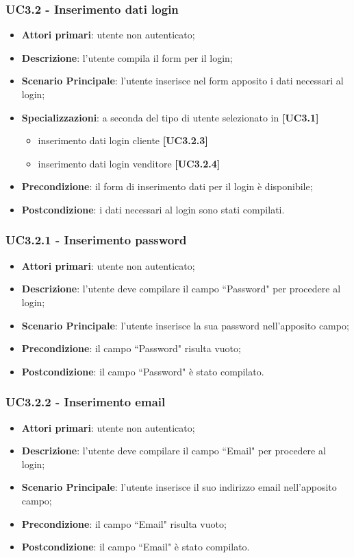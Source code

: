 \subsubsection{UC3.2 - Inserimento dati login}
\begin{itemize}
\item \textbf{Attori primari}: utente non autenticato;
\item \textbf{Descrizione}: l'utente compila il form per il login;
\item \textbf{Scenario Principale}: l'utente inserisce nel form apposito i dati necessari al login;
\item \textbf{Specializzazioni}: a seconda del tipo di utente selezionato in \textbf{[UC3.1]}
\begin{itemize}
	\item inserimento dati login cliente \textbf{[UC3.2.3]}
	\item inserimento dati login venditore \textbf{[UC3.2.4]}
\end{itemize}
\item \textbf{Precondizione}: il form di inserimento dati per il login è disponibile;
\item \textbf{Postcondizione}: i dati necessari al login sono stati compilati.
\end{itemize}

\subsubsection{UC3.2.1 - Inserimento password}
\begin{itemize}
\item \textbf{Attori primari}: utente non autenticato;
\item \textbf{Descrizione}: l'utente deve compilare il campo ``Password" per procedere al login;
\item \textbf{Scenario Principale}: l'utente inserisce la sua password nell'apposito campo;
\item \textbf{Precondizione}: il campo ``Password" risulta vuoto;
\item \textbf{Postcondizione}: il campo ``Password" è stato compilato.
\end{itemize}

\subsubsection{UC3.2.2 - Inserimento email}
\begin{itemize}
\item \textbf{Attori primari}: utente non autenticato;
\item \textbf{Descrizione}: l'utente deve compilare il campo ``Email" per procedere al login;
\item \textbf{Scenario Principale}: l'utente inserisce il suo indirizzo email nell'apposito campo;
\item \textbf{Precondizione}: il campo ``Email" risulta vuoto;
\item \textbf{Postcondizione}: il campo ``Email" è stato compilato.
\end{itemize}

